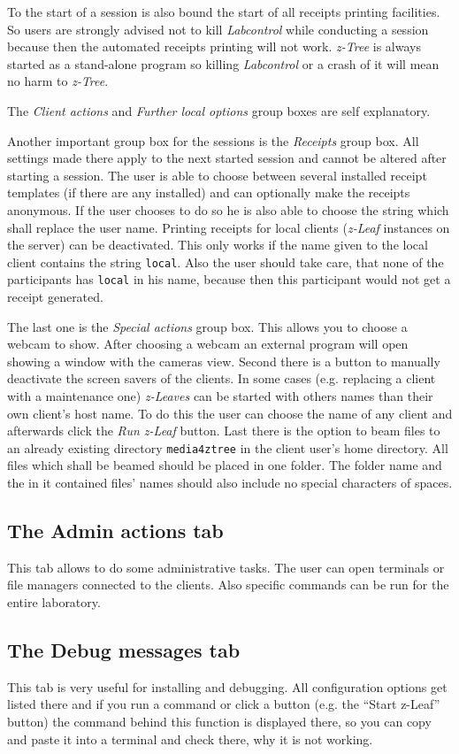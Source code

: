 \documentclass[a4paper,10pt]{article}
\begin{document}
To the start of a session is also bound the start of all receipts printing facilities. So users are strongly advised not to kill \emph{Labcontrol} while conducting a session because then the automated receipts printing will not work. \emph{z-Tree} is always started as a stand-alone program so killing \emph{Labcontrol} or a crash of it will mean no harm to \emph{z-Tree}.

The \emph{Client actions} and \emph{Further local options} group boxes are self explanatory.

Another important group box for the sessions is the \emph{Receipts} group box. All settings made there apply to the next started session and cannot be altered after starting a session. The user is able to choose between several installed receipt templates (if there are any installed) and can optionally make the receipts anonymous. If the user chooses to do so he is also able to choose the string which shall replace the user name. Printing receipts for local clients (\emph{z-Leaf} instances on the server) can be deactivated. This only works if the name given to the local client contains the string \texttt{local}. Also the user should take care, that none of the participants has \texttt{local} in his name, because then this participant would not get a receipt generated.

The last one is the \emph{Special actions} group box. This allows you to choose a webcam to show. After choosing a webcam an external program will open showing a window with the cameras view. Second there is a button to manually deactivate the screen savers of the clients. In some cases (e.g. replacing a client with a maintenance one) \emph{z-Leaves} can be started with others names than their own client's host name. To do this the user can choose the name of any client and afterwards click the \emph{Run z-Leaf} button. Last there is the option to beam files to an already existing directory \texttt{media4ztree} in the client user's home directory. All files which shall be beamed should be placed in one folder. The folder name and the in it contained files' names should also include no special characters of spaces.

\subsection{The Admin actions tab}

This tab allows to do some administrative tasks. The user can open terminals or file managers connected to the clients. Also specific commands can be run for the entire laboratory.

\subsection{The Debug messages tab}

This tab is very useful for installing and debugging. All configuration options get listed there and if you run a command or click a button (e.g. the "`Start z-Leaf"' button) the command behind this function is displayed there, so you can copy and paste it into a terminal and check there, why it is not working.
\end{document}
